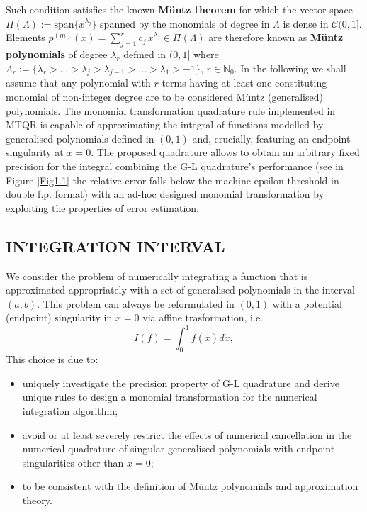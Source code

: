 \documentclass[a4paper, twosided]{book}
\begin{document}
\noindent
Such condition satisfies the known \color{poliDarkBlue} \textbf{Müntz theorem} \color{black} for which the vector space $\Pi(\Lambda):=\text{span}\{x^{\lambda_j}\}$ spanned by the monomials of degree in $\Lambda$ is dense in $\mathcal{C}(0,1]$. Elements $p^{(m)}(x) = \sum_{j=1}^{r} c_j\,x^{\lambda_j}\in\Pi(\Lambda)$ are therefore known as \color{poliDarkBlue} \textbf{Müntz polynomials} \color{black} of degree $\lambda_r$ defined in $(0,1]$ where  $\Lambda_r:=\{\lambda_r>\dots>\lambda_j>\lambda_{j-1}>\dots>\lambda_1>-1\},\, r\in\mathbb{N}_0$. In the following we shall assume that any polynomial with $r$ terms having at least one constituting monomial of non-integer degree are to be considered Müntz (generalised) polynomials. The monomial transformation quadrature rule implemented in MTQR is capable of approximating the integral of functions modelled by generalised polynomials defined in $(0,1)$ and, crucially, featuring an endpoint singularity at $x=0$. The proposed quadrature allows to obtain an arbitrary fixed precision for the integral combining the G-L quadrature's performance (see in Figure \ref{Fig1.1} the relative error falls below the machine-epsilon threshold in double f.p. format) with an ad-hoc designed monomial transformation by exploiting the properties of error estimation.



\subsection[Integration interval]{\changefont INTEGRATION INTERVAL}\label{SubSec1.2.5}

We consider the problem of numerically integrating a function that is approximated appropriately with a set of generalised polynomials in the interval $(a,b)$. This problem can always be reformulated in $(0,1)$ with a potential (endpoint) singularity in $x=0$ via affine trasformation, i.e. 
\begin{equation}\label{eq1.11}
    I(f) = \int_0^1 f(\tilde{x}) d\tilde{x},
\end{equation}
This choice is due to:
\begin{itemize}
  \item uniquely investigate the precision property of G-L quadrature and derive unique rules to design a monomial transformation for the numerical integration algorithm;
  \item avoid or at least severely restrict the effects of numerical cancellation in the numerical quadrature of singular generalised polynomials with endpoint singularities other than $x=0$;
  \item to be consistent with the definition of Müntz polynomials and approximation theory.
\end{itemize}
\end{document}
